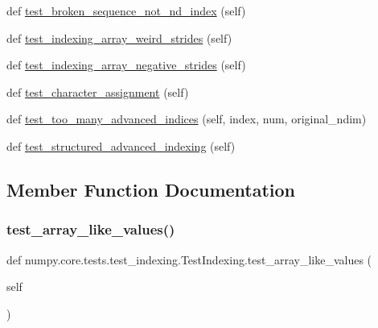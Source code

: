\begin{DoxyCompactItemize}
\item 
def \hyperlink{classnumpy_1_1core_1_1tests_1_1test__indexing_1_1TestIndexing_a2025918a81b55c96f769309a40619863}{test\+\_\+broken\+\_\+sequence\+\_\+not\+\_\+nd\+\_\+index} (self)
\item 
def \hyperlink{classnumpy_1_1core_1_1tests_1_1test__indexing_1_1TestIndexing_a69dfb3399f881179ae9e9a98a1cf6e5c}{test\+\_\+indexing\+\_\+array\+\_\+weird\+\_\+strides} (self)
\item 
def \hyperlink{classnumpy_1_1core_1_1tests_1_1test__indexing_1_1TestIndexing_a17b9bf174a53440f9e5debf4c7233a10}{test\+\_\+indexing\+\_\+array\+\_\+negative\+\_\+strides} (self)
\item 
def \hyperlink{classnumpy_1_1core_1_1tests_1_1test__indexing_1_1TestIndexing_a46470f2ecf9b39b78c7800a2a209e369}{test\+\_\+character\+\_\+assignment} (self)
\item 
def \hyperlink{classnumpy_1_1core_1_1tests_1_1test__indexing_1_1TestIndexing_a952eff1300096924f4b216bb59e9929d}{test\+\_\+too\+\_\+many\+\_\+advanced\+\_\+indices} (self, index, num, original\+\_\+ndim)
\item 
def \hyperlink{classnumpy_1_1core_1_1tests_1_1test__indexing_1_1TestIndexing_a0d0a5962cfa5dcb5ef8036293edc2f0f}{test\+\_\+structured\+\_\+advanced\+\_\+indexing} (self)
\end{DoxyCompactItemize}


\subsection{Member Function Documentation}
\mbox{\label{classnumpy_1_1core_1_1tests_1_1test__indexing_1_1TestIndexing_a86461ab8b1f9eb6dcb69da70847cc317}} 
\subsubsection{\texorpdfstring{test\+\_\+array\+\_\+like\+\_\+values()}{test\_array\_like\_values()}}
{\footnotesize\ttfamily def numpy.\+core.\+tests.\+test\+\_\+indexing.\+Test\+Indexing.\+test\+\_\+array\+\_\+like\+\_\+values (\begin{DoxyParamCaption}\item[{}]{self }\end{DoxyParamCaption})}


